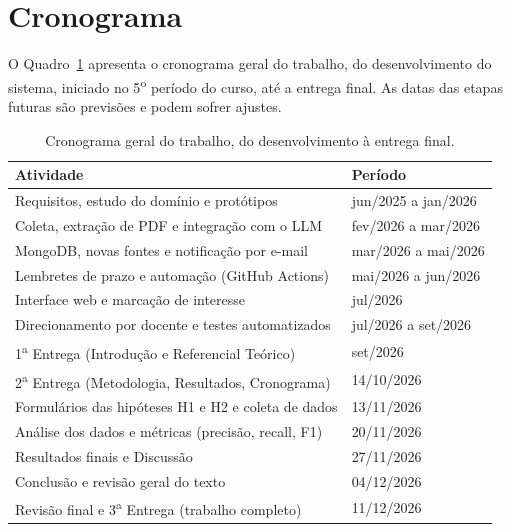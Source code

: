 \documentclass[12pt]{article}
\begin{document}
  \section{Cronograma}\label{sec:cronograma}

  O Quadro~\ref{tab:cronograma} apresenta o cronograma geral do trabalho, do desenvolvimento do sistema, iniciado no 5\textsuperscript{o} período do curso, até a entrega final. As datas das etapas futuras são previsões e podem sofrer ajustes.

  \begin{table}[H]
  \caption{Cronograma geral do trabalho, do desenvolvimento à entrega final.}
  \label{tab:cronograma}
  \centering
  \small
  \begin{tabular}{p{9.2cm}l}
  \hline
  \textbf{Atividade} & \textbf{Período} \\
  \hline
  Requisitos, estudo do domínio e protótipos & jun/2025 a jan/2026 \\
  Coleta, extração de PDF e integração com o LLM & fev/2026 a mar/2026 \\
  MongoDB, novas fontes e notificação por e-mail & mar/2026 a mai/2026 \\
  Lembretes de prazo e automação (GitHub Actions) & mai/2026 a jun/2026 \\
  Interface web e marcação de interesse & jul/2026 \\
  Direcionamento por docente e testes automatizados & jul/2026 a set/2026 \\
  1\textsuperscript{a} Entrega (Introdução e Referencial Teórico) & set/2026 \\
  2\textsuperscript{a} Entrega (Metodologia, Resultados, Cronograma) & 14/10/2026 \\
  Formulários das hipóteses H1 e H2 e coleta de dados & 13/11/2026 \\
  Análise dos dados e métricas (precisão, recall, F1) & 20/11/2026 \\
  Resultados finais e Discussão & 27/11/2026 \\
  Conclusão e revisão geral do texto & 04/12/2026 \\
  Revisão final e 3\textsuperscript{a} Entrega (trabalho completo) & 11/12/2026 \\
  \hline
  \end{tabular}
\end{table}
\end{document}
